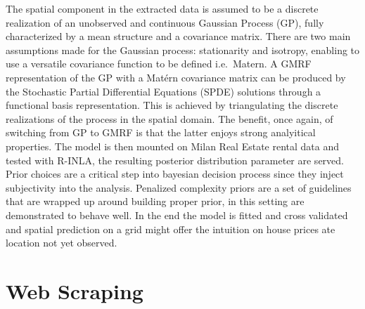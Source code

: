 \documentclass[
  12pt,
  a4paper,
  oneside]{book}
\theoremstyle{definition}
\theoremstyle{definition}
\theoremstyle{definition}
\theoremstyle{remark}
\begin{document}
The spatial component in the extracted data is assumed to be a discrete realization of an unobserved and continuous Gaussian Process (GP), fully characterized by a mean structure and a covariance matrix. There are two main assumptions made for the Gaussian process: stationarity and isotropy, enabling to use a versatile covariance function to be defined i.e.~Matern. A GMRF representation of the GP with a Matérn covariance matrix can be produced by the Stochastic Partial Differential Equations (SPDE) solutions through a functional basis representation. This is achieved by triangulating the discrete realizations of the process in the spatial domain. The benefit, once again, of switching from GP to GMRF is that the latter enjoys strong analyitical properties. The model is then mounted on Milan Real Estate rental data and tested with R-INLA, the resulting posterior distribution parameter are served. Prior choices are a critical step into bayesian decision process since they inject subjectivity into the analysis. Penalized complexity priors are a set of guidelines that are wrapped up around building proper prior, in this setting are demonstrated to behave well. In the end the model is fitted and cross validated and spatial prediction on a grid might offer the intuition on house prices ate location not yet observed.

\hypertarget{scraping}{%
\chapter{Web Scraping}\label{scraping}}
\end{document}
